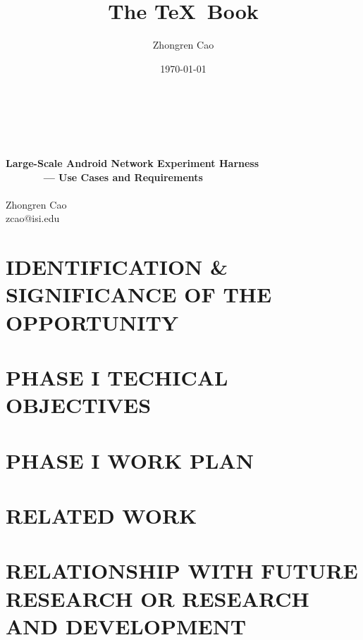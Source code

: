\documentclass[letterpaper,11pt]{article}
\author{Zhongren Cao}
\title{The \TeX\ Book}
\date{\today}
\begin{document}
\thispagestyle{fancy}


\begin{center}
~\\
~\\
~\\
{\LARGE{\bf{Large-Scale Android Network Experiment Harness\\
~~~~~~ --- Use Cases and Requirements}}}\\
~\\
\vspace{0.1in}
Zhongren Cao\\
zcao@isi.edu
\end{center}

\vspace{0.1in}


\section{IDENTIFICATION \& SIGNIFICANCE OF THE OPPORTUNITY} 

\section{PHASE I TECHICAL OBJECTIVES}

\section{PHASE I WORK PLAN}

\section{RELATED WORK}

\section{RELATIONSHIP WITH FUTURE RESEARCH OR RESEARCH AND DEVELOPMENT}
\end{document}

